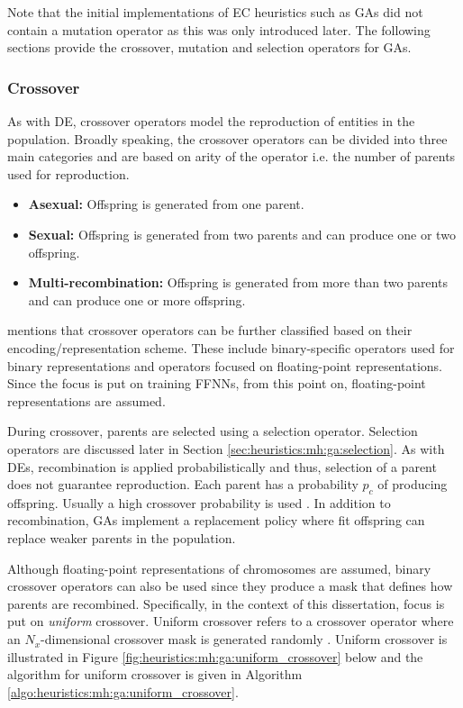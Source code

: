 Note that the initial implementations of \ac{EC} heuristics such as \acp{GA} did not contain a mutation operator as this was only introduced later. The following sections provide the crossover, mutation and selection operators for \acp{GA}.

\subsubsection{Crossover}
\label{sec:heuristics:mh:ga:crossover}

As with \ac{DE}, crossover operators model the reproduction of entities in the population. Broadly speaking, the crossover operators can be divided into three main categories \cite{ref:engelbrecht:2007} and are based on arity of the operator i.e. the number of parents used for reproduction.

\begin{itemize}
      \item \textbf{Asexual: } Offspring is generated from one parent.

      \item \textbf{Sexual: } Offspring is generated from two parents and can produce one or two offspring.

      \item \textbf{Multi-recombination: } Offspring is generated from more than two parents and can produce one or more offspring.
\end{itemize}

\citeauthor{ref:engelbrecht:2007}\cite{ref:engelbrecht:2007} mentions that crossover operators can be further classified based on their encoding/representation scheme. These include binary-specific operators used for binary representations and operators focused on floating-point representations. Since the focus is put on training \acp{FFNN}, from this point on, floating-point representations are assumed.

During crossover, parents are selected using a selection operator. Selection operators are discussed later in Section \ref{sec:heuristics:mh:ga:selection}. As with \acp{DE}, recombination is applied probabilistically and thus, selection of a parent does not guarantee reproduction. Each parent has a probability $p_{c}$ of producing offspring. Usually a high crossover probability is used \cite{ref:engelbrecht:2007}. In addition to recombination, \acp{GA} implement a replacement policy where fit offspring can replace weaker parents in the population.

Although floating-point representations of chromosomes are assumed, binary crossover operators can also be used since they produce a mask that defines how parents are recombined. Specifically, in the context of this dissertation, focus is put on \textit{uniform} crossover. Uniform crossover refers to a crossover operator where an $N_{x}$-dimensional crossover mask is generated randomly \cite{ref:syswerda:1989}. Uniform crossover is illustrated in Figure \ref{fig:heuristics:mh:ga:uniform_crossover} below and the algorithm for uniform crossover is given in Algorithm \ref{algo:heuristics:mh:ga:uniform_crossover}.


